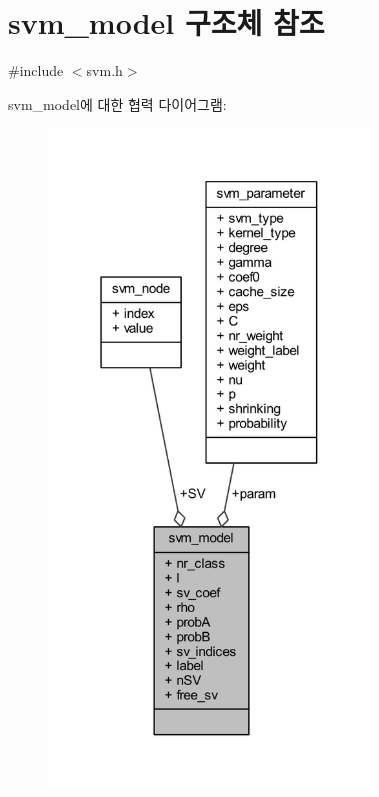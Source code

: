 \hypertarget{structsvm__model}{\section{svm\+\_\+model 구조체 참조}
\label{structsvm__model}
}


{\ttfamily \#include $<$svm.\+h$>$}



svm\+\_\+model에 대한 협력 다이어그램\+:
\nopagebreak
\begin{figure}[H]
\begin{center}
\leavevmode
\includegraphics[width=242pt]{structsvm__model__coll__graph}
\end{center}
\end{figure}
